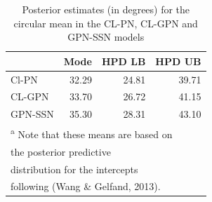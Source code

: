 \documentclass[12pt,]{article}
\begin{document}
\begin{table}
\caption{\label{tab:means}Posterior estimates (in degrees) for the circular mean in the CL-PN, CL-GPN and GPN-SSN models}
\centering
\begin{tabular}[t]{lrrr}
\toprule
  & Mode & HPD LB & HPD UB\\
  \midrule
Cl-PN & 32.29 & 24.81 & 39.71\\
CL-GPN & 33.70 & 26.72 & 41.15\\
GPN-SSN & 35.30 & 28.31 & 43.10\\
\bottomrule
\multicolumn{4}{l}{\textsuperscript{a} Note that these means are based on}\\
\multicolumn{4}{l}{the posterior predictive}\\
\multicolumn{4}{l}{distribution for the intercepts}\\
\multicolumn{4}{l}{following (Wang \& Gelfand, 2013).}\\
\end{tabular}
\end{table}
\end{document}
